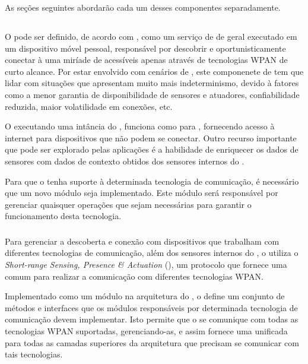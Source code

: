 As seções seguintes abordarão cada um desses componentes separadamente.

\subsection{\mhub}

O \middleware \mhub pode ser definido, de acordo com , como um serviço de \middleware de \iomt geral executado em um dispositivo móvel pessoal, responsável por descobrir e oportunisticamente conectar à uma miríade de \smartobjs acessíveis apenas através de tecnologias WPAN de curto alcance. Por estar envolvido com cenários de \iomt, este componenete de \software tem que lidar com situações que apresentam muito mais indeterminismo, devido à fatores como a menor garantia de disponibilidade de sensores e atuadores, confiabilidade reduzida, maior volatilidade em conexões, etc.

O \smartphone executando uma intância do \mhub, funciona como \gateway para \smartobjs, fornecendo acesso à internet para dispositivos que não podem se conectar. Outro recurso importante que pode ser explorado pelas aplicações é a habilidade de enriquecer os dados de sensores com dados de contexto obtidos dos sensores internos do \mhub.

Para que o \mhub tenha suporte à determinada tecnologia de comunicação, é necessário que um novo módulo seja implementado. Este módulo será responsável por gerenciar quaisquer operações que sejam necessárias para garantir o funcionamento desta tecnologia.

\subsubsection{\stwopa}

Para gerenciar a descoberta e conexão com dispositivos que trabalham com diferentes tecnologias de comunicação, além dos sensores internos do \smartphone, o \mhub utiliza o \textit{Short-range Sensing, Presence \& Actuation} (\stwopa), um protocolo que fornece uma \api comum para realizar a comunicação com diferentes tecnologias WPAN.

Implementado como um módulo na arquitetura do \middleware, o \stwopa define um conjunto de métodos e interfaces que os módulos responsáveis por determinada tecnologia de comunicação devem implementar. Isto permite que o \stwopa se comunique com todas as tecnologias WPAN suportadas, gerenciando-as, e assim fornece uma \api unificada para todas as camadas superiores da arquitetura que precisam se comunicar com tais tecnologias.

